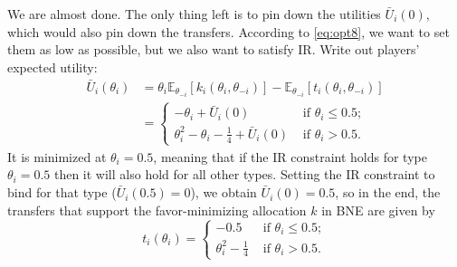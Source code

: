 \documentclass[a4paper]{article}
\begin{document}
	We are almost done. The only thing left is to pin down the utilities $\bar{U}_i(0)$, which would also pin down the transfers. According to \eqref{eq:opt8}, we want to set them as low as possible, but we also want to satisfy IR. Write out players' expected utility:
	\begin{align*}
		\bar{U}_i (\theta_i) &= \theta_i \mathbb{E}_{\theta_{-i}} [k_i(\theta_i,\theta_{-i})] - \mathbb{E}_{\theta_{-i}} [t_i(\theta_i,\theta_{-i})] 
		\\
		&= \begin{cases}
			-\theta_i + \bar{U}_i(0)	& \text{ if } \theta_i \leq 0.5;
			\\
			\theta_i^2 - \theta_i - \frac{1}{4} + \bar{U}_i(0)	& \text{ if } \theta_i > 0.5.
		\end{cases}
	\end{align*}
	It is minimized at $\theta_i=0.5$, meaning that if the IR constraint holds for type $\theta_i=0.5$ then it will also hold for all other types.%
	Setting the IR constraint to bind for that type ($\bar{U}_i(0.5)=0$), we obtain $\bar{U}_i(0) = 0.5$, so in the end, the transfers that support the favor-minimizing allocation $k$ in BNE are given by
	$$t_i(\theta_i) = 
	\begin{cases}
		- 0.5	& \text{ if } \theta_i \leq 0.5;
		\\
		\theta_i^2 - \frac{1}{4}	& \text{ if } \theta_i > 0.5.
	\end{cases}$$
\fi
\end{document}

